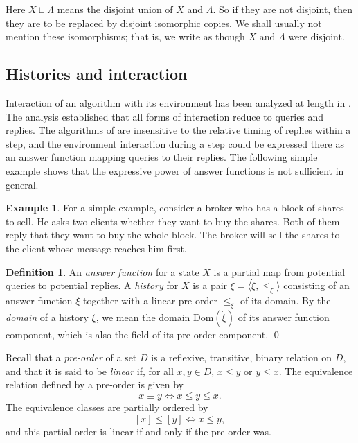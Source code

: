 \documentclass{LMCS}
\theoremstyle{definition}
\newtheorem{df}[thm]{Definition}
\newtheorem{ex}[thm]{Example}
\newcommand{\ans}{\dot}
\newcommand{\dom}[1]{\ensuremath{{\text{Dom}}(#1)}}
\newcommand{\sq}[1]{\ensuremath{\langle#1\rangle}}
\begin{document}
Here $X\sqcup\Lambda$ means the disjoint union of $X$ and $\Lambda$.
So if they are not disjoint, then they are to be replaced by disjoint
isomorphic copies.  We shall usually not mention these isomorphisms;
that is, we write as though $X$ and $\Lambda$ were disjoint.

\subsection{Histories and interaction}  \label{hist}

Interaction of an algorithm with its environment has been analyzed at
length in \cite{oa1}.  The analysis established that all forms of
interaction reduce to queries and replies.  The algorithms of
\cite{oa1,oa2,oa3} are insensitive to the relative timing of replies
within a step, and the environment interaction during a step could be
expressed there as an answer function mapping queries to their
replies.  The following simple example shows that the expressive power of
answer functions is not sufficient in general.

\begin{ex}\label{ex:broker} For a simple example, consider a
  broker who has a block of shares to sell.  He asks two clients
  whether they want to buy the shares.  Both of them reply that they
  want to buy the whole block.  The broker will sell the shares to the
  client whose message reaches him first.
\end{ex}

\begin{df}       \label{ans-fn}
An \emph{answer function} for a state $X$ is a partial map from
potential queries to potential replies.  A \emph{history} for $X$ is a
pair $\xi=\sq{\ans\xi,\leq_\xi}$ consisting of an answer function
$\ans\xi$ together with a linear pre-order $\leq_\xi$ of its domain.
By the \emph{domain} of a history $\xi$, we mean the domain
\dom{\ans\xi} of its answer function component, which is also the
field of its pre-order component.
\qed\end{df}

Recall that a \emph{pre-order} of a set $D$ is a reflexive,
transitive, binary relation on $D$, and that it is said to be
\emph{linear} if, for all $x,y\in D$, $x\leq y$ or $y\leq x$.  The
equivalence relation defined by a pre-order is given by
$$
x\equiv y\iff x\leq y\leq x.
$$
The equivalence classes are partially ordered by
$$
[x]\leq[y]\iff x\leq y,
$$
and this partial order is linear if and only if the pre-order was.
\end{document}
